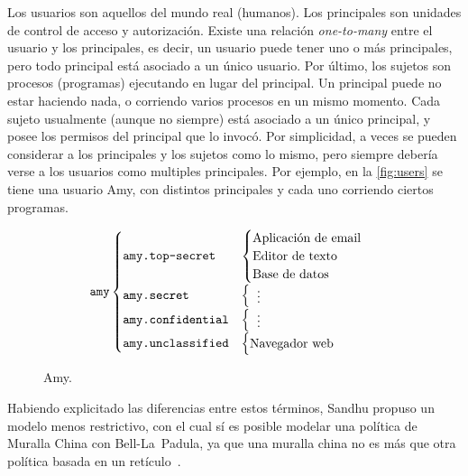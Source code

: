 \documentclass[spanish]{article}
\begin{document}
Los usuarios son aquellos del mundo real (humanos). Los principales son unidades
de control de acceso y autorización. Existe una relación \textit{one-to-many}
entre el usuario y los principales, es decir, un usuario puede tener uno o más
principales, pero todo principal está asociado a un único usuario. Por último,
los sujetos son procesos (programas) ejecutando en lugar del principal. Un
principal puede no estar haciendo nada, o corriendo varios procesos en un mismo
momento. Cada sujeto usualmente (aunque no siempre) está asociado a un único
principal, y posee los permisos del principal que lo invocó. Por simplicidad, a
veces se pueden considerar a los principales y los sujetos como lo mismo, pero
siempre debería verse a los usuarios como multiples principales. Por ejemplo, en
la \autoref{fig:users} se tiene una usuario Amy, con distintos principales y
cada uno corriendo ciertos programas.
\begin{figure}[ht]
\[
  \texttt{amy}
  \begin{cases}
    \texttt{amy.top-secret} &
    \begin{cases}
      \text{Aplicación de email} \\
      \text{Editor de texto} \\
      \text{Base de datos} \\
    \end{cases}\\
    \texttt{amy.secret} &
    \begin{cases}
      \hspace{2mm}\vdots \\
    \end{cases}\\
    \texttt{amy.confidential} &
    \begin{cases}
      \hspace{2mm}\vdots \\
    \end{cases}\\
    \texttt{amy.unclassified} &
    \begin{cases}
      \text{Navegador web} \\
    \end{cases}\\
  \end{cases}\\
\] 
\caption{Amy.\label{fig:users}}
\end{figure}
Habiendo explicitado las diferencias entre estos términos, Sandhu propuso un
modelo menos restrictivo, con el cual sí es posible modelar una política de
Muralla China con Bell-La~Padula, ya que una muralla china no es más que otra
política basada en un retículo~\cite{Sandhu92,Sandhu92b,Sandhu93}.
\end{document}
